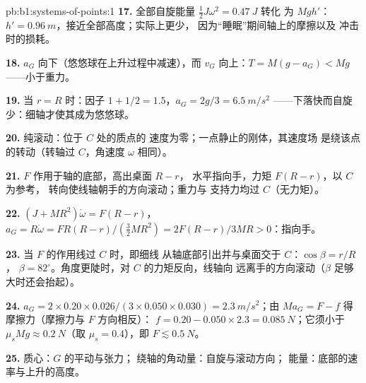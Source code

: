 \begin{solution}{pb:b1:systems-of-points:1}
\textbf{17.} 全部自旋能量 $\tfrac12 J\omega^2 = \qty{0.47}{J}$ 转化
为 $Mgh'$：$h' = \qty{0.96}{m}$，接近全部高度；实际上更少，
因为“睡眠”期间轴上的摩擦以及
冲击时的损耗。

\textbf{18.} $a_G$ 向下（悠悠球在上升过程中减速），而
$v_G$ 向上：$T = M(g - a_G) < Mg$——小于重力。

\textbf{19.} 当 $r = R$ 时：因子 $1 + 1/2 = 1.5$，$a_G = 2g/3 = \qty{6.5}{m/s^2}$
——下落快而自旋少：细轴才使其成为悠悠球。

\textbf{20.} 纯滚动：位于 $C$ 处的质点的
速度为零；一点静止的刚体，其速度场
是绕该点的转动（转轴过 $C$，角速度 $\omega$ 相同）。

\textbf{21.} $F$ 作用于轴的底部，高出桌面 $R - r$，
水平指向手，力矩 $F(R - r)$，以 $C$ 为参考，
转向使线轴朝手的方向滚动；重力与
支持力均过 $C$（无力矩）。

\textbf{22.} $(J + MR^2)\dot\omega = F(R - r)$，$a_G = R\dot\omega = FR(R - r)/
(\tfrac32 MR^2) = 2F(R - r)/3MR > 0$：指向手。

\textbf{23.} 当 $F$ 的作用线过 $C$ 时，即细线
从轴底部引出并与桌面交于 $C$：$\cos\beta = r/R$，
$\beta = 82^\circ$。角度更陡时，对 $C$ 的力矩反向，线轴向
远离手的方向滚动（$\beta$ 足够大时还会抬起）。

\textbf{24.} $a_G = 2 \times 0.20 \times 0.026/(3 \times 0.050 \times 0.030) =
\qty{2.3}{m/s^2}$；由 $Ma_G = F - f$ 得摩擦力（摩擦力与 $F$ 方向相反）：
$f = 0.20 - 0.050 \times 2.3 = \qty{0.085}{N}$；它须小于 $\mu_sMg
\approx \qty{0.2}{N}$（取 $\mu_s = 0.4$），即 $F \lesssim \qty{0.5}{N}$。

\textbf{25.} 质心：$G$ 的平动与张力；
绕轴的角动量：自旋与滚动方向；
能量：底部的速率与上升的高度。
\end{solution}
